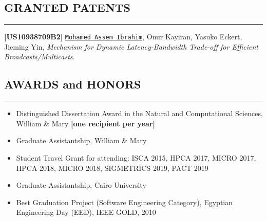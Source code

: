 \documentclass[10pt,a4]{article}
\begin{document}
\subsection*{GRANTED PATENTS}
\hrule
\vspace{0.2cm}

\begin{description}

\item 
{\bf [US10938709B2]}
{\tt \underline{Mohamed Assem Ibrahim}}, Onur Kayiran, Yasuko Eckert, Jieming Yin,
{\it Mechanism for Dynamic Latency-Bandwidth Trade-off for Efficient Broadcasts/Multicasts}.

\end{description}

\subsection*{AWARDS and HONORS}
\hrule
\vspace{0.2cm}
\begin{itemize}
\item Distinguished Dissertation Award in the Natural and Computational Sciences, William \& Mary {\bf [one recipient per year]}
\item Graduate Assistantship, William \& Mary
\item Student Travel Grant for attending: ISCA 2015, HPCA 2017, MICRO 2017, HPCA 2018, MICRO 2018, SIGMETRICS 2019, PACT 2019
\item Graduate Assistantship, Cairo University
\item Best Graduation Project (Software Engineering Category), Egyptian Engineering Day (EED), IEEE GOLD, 2010
\end{itemize}



\end{document}
